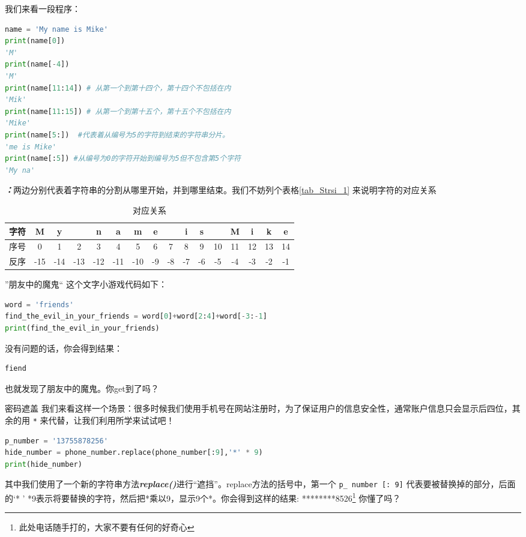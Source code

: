 我们来看一段程序：
\begin{lstlisting}[language=python]
name = 'My name is Mike'
print(name[0])
'M'
print(name[-4])
'M'
print(name[11:14]) # 从第一个到第十四个，第十四个不包括在内
'Mik'
print(name[11:15]) # 从第一个到第十五个，第十五个不包括在内
'Mike'
print(name[5:])  #代表着从编号为5的字符到结束的字符串分片。
'me is Mike'
print(name[:5]) #从编号为0的字符开始到编号为5但不包含第5个字符
'My na'
\end{lstlisting}
\textbf{\textsl{：}}两边分别代表着字符串的分割从哪里开始，并到哪里结束。我们不妨列个表格\autoref{tab_Strsi_1} 来说明字符的对应关系
\begin{table}[ht]
\centering
\caption{对应关系}\label{tab_Strsi_1}
\begin{tabular}{|c|c|c|c|c|c|c|c|c|c|c|c|c|c|c|c|}
\hline
 字符  & M & y &   & n & a & m & e &   & i & s &   & M & i & k &e\\
\hline
 序号  & 0 & 1 & 2 & 3 & 4 & 5 & 6 & 7 & 8 & 9 & 10 & 11 & 12 & 13 & 14\\
\hline
 反序  & -15 & -14 & -13 & -12 & -11 & -10 & -9 & -8 & -7 & -6 & -5 & -4 & -3 & -2 & -1\\
\hline
\end{tabular}
\end{table}
\begin{example}{”朋友中的魔鬼“}
这个文字小游戏代码如下：
\begin{lstlisting}[language=python]
word = 'friends'
find_the_evil_in_your_friends = word[0]+word[2:4]+word[-3:-1] 
print(find_the_evil_in_your_friends)
\end{lstlisting}
没有问题的话，你会得到结果：
\begin{lstlisting}[language=python]
fiend
\end{lstlisting}
也就发现了朋友中的魔鬼。你get到了吗？
\end{example}
\begin{example}{密码遮盖}
我们来看这样一个场景：很多时候我们使用手机号在网站注册时，为了保证用户的信息安全性，通常账户信息只会显示后四位，其余的用 \verb|*| 来代替，让我们利用所学来试试吧！
\begin{lstlisting}[language=python]
p_number = '13755878256'
hide_number = phone_number.replace(phone_number[:9],'*' * 9)
print(hide_number)
\end{lstlisting}
其中我们使用了一个新的字符串方法\textbf{\textsl{replace()}}进行“遮挡”。replace方法的括号中，第一个 \verb|p_ number [: 9]| 代表要被替换掉的部分，后面的‘* ' *9表示将要替换的字符，然后把*乘以9，显示9个*。你会得到这样的结果: ********8526\footnote{此处电话随手打的，大家不要有任何的好奇心}
你懂了吗？
\end{example}

